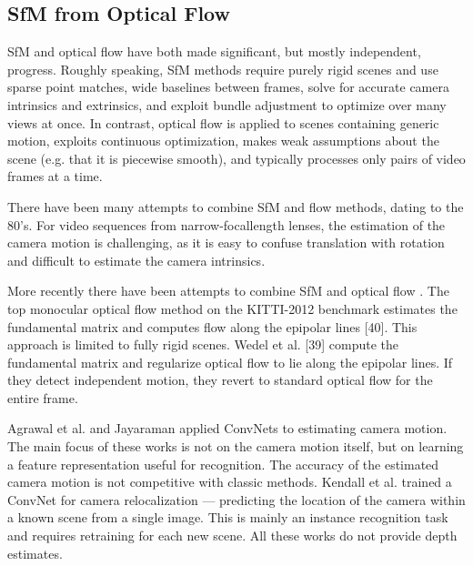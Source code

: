 \documentclass{article}
\begin{document}
\subsection{SfM from Optical Flow}

SfM and optical flow have both made significant, but mostly independent, progress. Roughly speaking, SfM methods require purely rigid scenes and use sparse point matches, wide baselines between frames, solve for accurate camera intrinsics and extrinsics, and exploit bundle adjustment to optimize over many views at once. In contrast, optical flow is applied to scenes containing generic motion, exploits continuous optimization, makes weak assumptions about the scene (e.g. that it is piecewise smooth), and typically processes only pairs of video frames at a time.\par

There have been many attempts to combine SfM and flow methods, dating to the 80’s\cite{Heeger1992Subspace}. For video sequences from narrow-focallength lenses, the estimation of the camera motion is challenging, as it is easy to confuse translation with rotation and difficult to estimate the camera intrinsics\cite{Horn1988Direct}.\par

More recently there have been attempts to combine SfM and optical flow \cite{Bai2016Exploiting} \cite{Oisel2001Epipolar} \cite{Valgaerts2008A} \cite{Wedel2009Structure} \cite{Yuan2007Detecting}. The top monocular optical flow method on the KITTI-2012 benchmark estimates the fundamental matrix and computes flow along the epipolar lines [40]. This approach is limited to fully rigid scenes. Wedel et al. [39] compute the fundamental matrix and regularize optical flow to lie along the epipolar lines. If they detect independent motion, they revert to standard optical flow for the entire frame. 


Agrawal et al. \cite{Agrawal2015Learning} and Jayaraman \cite{Jayaraman2015Learning} applied ConvNets to estimating camera motion. The main focus of these works is not on the camera motion itself, but on learning a feature representation useful for recognition. The accuracy of the estimated camera motion is not competitive with classic methods. Kendall et al. \cite{Kendall2015Modelling} trained a ConvNet for camera relocalization — predicting the location of the camera within a known scene from a single image. This is mainly an instance recognition task and requires retraining for each new scene. All these works do not provide depth estimates.
\end{document}

